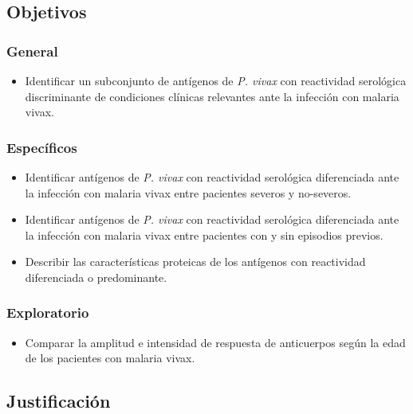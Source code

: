 \documentclass[]{article}
\providecommand{\tightlist}{%
  \setlength{\itemsep}{0pt}\setlength{\parskip}{0pt}}
\begin{document}
\subsection{Objetivos}\label{objetivos}

\subsubsection{General}\label{general}

\begin{itemize}
\tightlist
\item
  Identificar un subconjunto de antígenos de \emph{P. vivax} con
  reactividad serológica discriminante de condiciones clínicas
  relevantes ante la infección con malaria vivax.
\end{itemize}

\subsubsection{Específicos}\label{especificos}

\begin{itemize}
\item
  Identificar antígenos de \emph{P. vivax} con reactividad serológica
  diferenciada ante la infección con malaria vivax entre pacientes
  severos y no-severos.
\item
  Identificar antígenos de \emph{P. vivax} con reactividad serológica
  diferenciada ante la infección con malaria vivax entre pacientes con y
  sin episodios previos.
\item
  Describir las características proteicas de los antígenos con
  reactividad diferenciada o predominante.
\end{itemize}

\subsubsection{Exploratorio}\label{exploratorio}

\begin{itemize}
\tightlist
\item
  Comparar la amplitud e intensidad de respuesta de anticuerpos según la
  edad de los pacientes con malaria vivax.
\end{itemize}

\subsection{Justificación}\label{justif}
\end{document}
